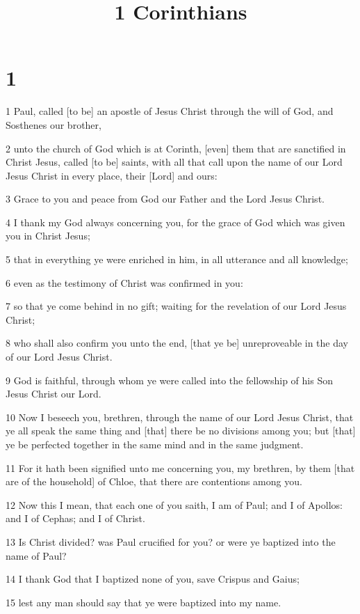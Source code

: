

\title{1 Corinthians}

\chapter{1}

\par 1 Paul, called [to be] an apostle of Jesus Christ through the will of God, and Sosthenes our brother,
\par 2 unto the church of God which is at Corinth, [even] them that are sanctified in Christ Jesus, called [to be] saints, with all that call upon the name of our Lord Jesus Christ in every place, their [Lord] and ours:
\par 3 Grace to you and peace from God our Father and the Lord Jesus Christ.
\par 4 I thank my God always concerning you, for the grace of God which was given you in Christ Jesus;
\par 5 that in everything ye were enriched in him, in all utterance and all knowledge;
\par 6 even as the testimony of Christ was confirmed in you:
\par 7 so that ye come behind in no gift; waiting for the revelation of our Lord Jesus Christ;
\par 8 who shall also confirm you unto the end, [that ye be] unreproveable in the day of our Lord Jesus Christ.
\par 9 God is faithful, through whom ye were called into the fellowship of his Son Jesus Christ our Lord.
\par 10 Now I beseech you, brethren, through the name of our Lord Jesus Christ, that ye all speak the same thing and [that] there be no divisions among you; but [that] ye be perfected together in the same mind and in the same judgment.
\par 11 For it hath been signified unto me concerning you, my brethren, by them [that are of the household] of Chloe, that there are contentions among you.
\par 12 Now this I mean, that each one of you saith, I am of Paul; and I of Apollos: and I of Cephas; and I of Christ.
\par 13 Is Christ divided? was Paul crucified for you? or were ye baptized into the name of Paul?
\par 14 I thank God that I baptized none of you, save Crispus and Gaius;
\par 15 lest any man should say that ye were baptized into my name.
